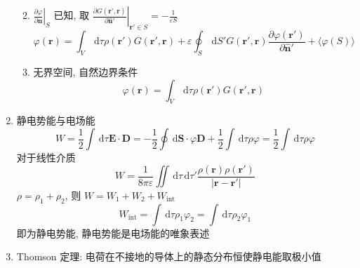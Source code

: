 \documentclass[12pt,a4paper]{article}%
\numberwithin{equation}{section}%
\renewcommand*{\vec}[1]{\bm{#1}}%
\newcommand{\dif}{\,\mathrm d}
\newcommand*{\uvec}[1]{\hat{\vec{#1}}}
\begin{document}
\begin{enumerate}
\begin{enumerate}
\begin{equation}
        \end{equation}
        \item $\left.\frac{\partial \varphi}{\partial \uvec n}\right|_{S}$ 已知, 取 $\left.\frac{\partial G(\vec r',\vec r)}{\partial \uvec n'}\right|_{\vec r'\in S} = -\frac 1{\varepsilon S}$
        \begin{equation}
            \varphi(\vec r) = \int_V\dif \tau\rho(\vec r')G(\vec r', \vec r) + \varepsilon\oint_S\dif S' G(\vec r', \vec r)\frac{\partial \varphi(\vec r')}{\partial \uvec n'} + \langle\varphi(S) \rangle
        \end{equation}
        \item 无界空间, 自然边界条件
        \begin{equation}
            \varphi(\vec r) = \int_V\dif \tau\rho(\vec r')G(\vec r', \vec r)
        \end{equation}
    \end{enumerate}
    \item 静电势能与电场能
    \begin{equation}
        W = \frac 12\int\dif \tau\vec E\cdot \vec D = -\frac 12\oint\dif\vec S\cdot\varphi\vec D + \frac 12 \int\dif \tau\rho\varphi = \frac 12\int\dif \tau\rho\varphi
    \end{equation}
    对于线性介质
    \begin{equation}
     W = \frac 1{8\pi\varepsilon}\iint\dif \tau\dif \tau' \frac{\rho(\vec r)\rho(\vec r')}{|\vec r -\vec r'|}
    \end{equation}
    $\rho = \rho_1 + \rho_2$, 则 $W = W_1 + W_2 + W_{\mathrm{int}}$
    \begin{equation}
        W_{\mathrm{int}} = \int\dif \tau\rho_1\varphi_2 = \int\dif \tau\rho_2\varphi_1
    \end{equation}
    即为静电势能, 静电势能是电场能的唯象表述
    \item Thomson 定理: 电荷在不接地的导体上的静态分布恒使静电能取极小值
\end{enumerate}
\end{document}
